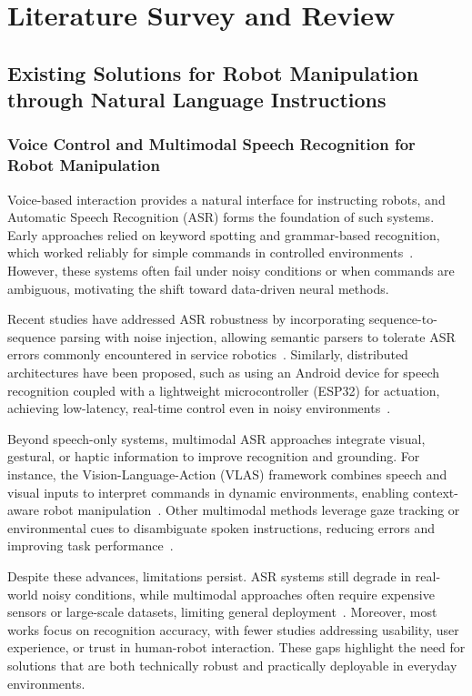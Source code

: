 \documentclass[12pt]{extarticle}
\begin{document}
\newpage
\section{Literature Survey and Review}

\subsection{Existing Solutions for Robot Manipulation through Natural Language Instructions}

\subsubsection{Voice Control and Multimodal Speech Recognition for Robot Manipulation}

Voice-based interaction provides a natural interface for instructing robots, and Automatic Speech Recognition (ASR) forms the foundation of such systems. Early approaches relied on keyword spotting and grammar-based recognition, which worked reliably for simple commands in controlled environments~\cite{smith2015voice}. However, these systems often fail under noisy conditions or when commands are ambiguous, motivating the shift toward data-driven neural methods.

Recent studies have addressed ASR robustness by incorporating sequence-to-sequence parsing with noise injection, allowing semantic parsers to tolerate ASR errors commonly encountered in service robotics~\cite{tada2020robust}. Similarly, distributed architectures have been proposed, such as using an Android device for speech recognition coupled with a lightweight microcontroller (ESP32) for actuation, achieving low-latency, real-time control even in noisy environments~\cite{gupta2025speech}.

Beyond speech-only systems, multimodal ASR approaches integrate visual, gestural, or haptic information to improve recognition and grounding. For instance, the Vision-Language-Action (VLAS) framework combines speech and visual inputs to interpret commands in dynamic environments, enabling context-aware robot manipulation~\cite{yu2020vlas}. Other multimodal methods leverage gaze tracking or environmental cues to disambiguate spoken instructions, reducing errors and improving task performance~\cite{liu2021multimodal}.

Despite these advances, limitations persist. ASR systems still degrade in real-world noisy conditions, while multimodal approaches often require expensive sensors or large-scale datasets, limiting general deployment~\cite{liu2021multimodal}. Moreover, most works focus on recognition accuracy, with fewer studies addressing usability, user experience, or trust in human-robot interaction. These gaps highlight the need for solutions that are both technically robust and practically deployable in everyday environments.
\end{document}
